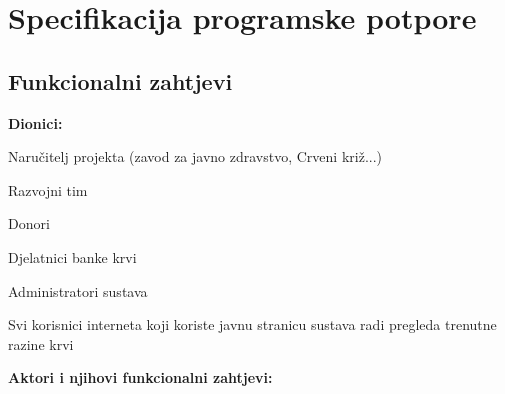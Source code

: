 \chapter{Specifikacija programske potpore}
		
	\section{Funkcionalni zahtjevi}
			
		    
				
			
			
			\noindent \textbf{Dionici:}
			
			\begin{packed_enum}
				
				\item Naručitelj projekta (zavod za javno zdravstvo, Crveni križ...)
				\item Razvojni tim
				\item Donori
				\item Djelatnici banke krvi
				\item Administratori sustava
				\item Svi korisnici interneta koji koriste javnu stranicu sustava radi pregleda trenutne razine krvi
				
			\end{packed_enum}
			
			\noindent \textbf{Aktori i njihovi funkcionalni zahtjevi:}
			
